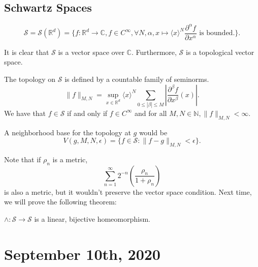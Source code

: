 \documentclass[11pt]{scrartcl}
\newcommand{\N}{\mathbb{N}}
\newcommand{\R}{\mathbb{R}}
\newcommand{\C}{\mathbb C}
\newcommand{\<}{\langle}
\renewcommand{\>}{\rangle}
\begin{document}
\subsection{Schwartz Spaces}
\begin{definition} $$\mathscr{S} = \mathscr{S}(\R^d) = \{f : \R^d \rightarrow \C, f \in C^{\infty}, \forall N, \alpha, x \mapsto \<x\>^N\frac{\partial^{\alpha}f}{\partial x^{\alpha}} \text{ is bounded.}\}.$$
\end{definition}
It is clear that $\mathscr{S}$ is a vector space over $\C$.  Furthermore, $\mathscr{S}$ is a topological vector space.  

The topology on $\mathscr{S}$ is defined by a countable family of seminorms.  
$$\|f\|_{M, N} = \sup_{x \in \R^d} \<x\>^N \sum_{0 \le |\beta| \le M} \left |\frac{\partial^\beta f}{\partial x^\beta}(x)\right |.$$
We have that $f \in \mathscr{S}$ if and only if $f \in C^{\infty}$ and for all $M, N \in \N, \|f\|_{M, N} < \infty$.

A neighborhood base for the topology at $g$ would be 
$$V(g, M, N, \epsilon) = \{f \in \mathscr{S} : \|f-g\|_{M, N} < \epsilon\}.$$

Note that if $\rho_n$ is a metric,
$$\sum_{n=1}^{\infty} 2^{-n}\left (\frac{\rho_n}{1+\rho_n}\right )$$ is also a metric, but it wouldn't preserve the vector space condition.  Next time, we will prove the following theorem:
\begin{thm} $\wedge:\mathscr{S} \rightarrow \mathscr{S}$ is a linear, bijective homeomorphism.
\end{thm}
\pagebreak
\section{September 10th, 2020}
\end{document}
